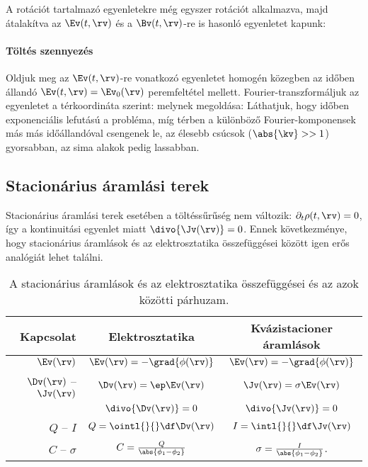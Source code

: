    A rotációt tartalmazó egyenletekre még egyszer rotációt alkalmazva, majd átalakítva az $\Ev(t,\rv)$ és a $\Bv(t,\rv)$-re is hasonló egyenletet kapunk:
   \paragraph{Töltés szennyezés}
    Oldjuk meg az $\Ev(t,\rv)$-re vonatkozó egyenletet homogén közegben az időben állandó $\Ev(t,\rv)=\Ev_0(\rv)$ peremfeltétel mellett.
   Fourier-transzformáljuk az egyenletet a térkoordináta szerint:
    melynek megoldása:
    Láthatjuk, hogy időben exponenciális lefutású a probléma, míg térben a különböző Fourier-kom\-po\-nen\-sek más más időállandóval csengenek le, az élesebb csúcsok ($\abs{\kv}>>1$) gyorsabban, az sima alakok pedig lassabban. 
    
  \subsection{Stacionárius áramlási terek}
   
   Stacionárius áramlási terek esetében a töltéssűrűség nem változik: $\partial_t\rho(t,\rv)=0$, így a kontinuitási egyenlet miatt $\divo{\Jv(\rv)}=0$.
   Ennek következménye, hogy stacionárius áramlások és az elektrosztatika összefüggései között igen erős analógiát lehet találni.
   \begin{table}[h!]
    \centering
    \begin{tabular}{r||c|c}
     Kapcsolat & Elektrosztatika & Kvázistacioner áramlások \\ \hline
     $\Ev(\rv)$ & $\Ev(\rv)=-\grad{\phi(\rv)}$ & $\Ev(\rv)=-\grad{\phi(\rv)}$ \\
     $\Dv(\rv)$ -- $\Jv(\rv)$ & $\Dv(\rv)=\ep\Ev(\rv)$ & $\Jv(\rv)=\sigma\Ev(\rv)$ \\
      & $\divo{\Dv(\rv)}=0$ & $\divo{\Jv(\rv)}=0$ \\
     $Q$ -- $I$ & $Q=\ointl{}{}\df\Dv(\rv)$ & $I=\intl{}{}\df\Jv(\rv)$ \\
     $C$ -- $\sigma$ & $C=\frac{Q}{\abs{\phi_1-\phi_2}}$ & $\sigma=\frac{I}{\abs{\phi_1-\phi_2}}$. \\
    \end{tabular}
    \caption{A stacionárius áramlások és az elektrosztatika összefüggései és az azok közötti párhuzam.}\label{tabl:08-stacstat}
   \end{table}
   
